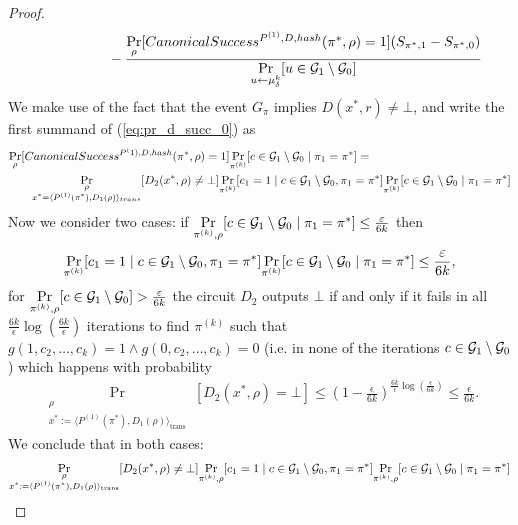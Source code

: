 \begin{proof}
\begin{align}
&\mbox\qquad\qquad\qquad-\frac{\underset{\rho}{\Pr}[CanonicalSuccess^{P^{(1)}, D, hash}(\pi^*, \rho) = 1] (S_{\pi^*,1} - S_{\pi^*,0})}
{\underset{u \leftarrow \mu_{\delta}^k}{\Pr}[u \in \mathcal{G}_1 \setminus \mathcal{G}_0]}
\end{align}
We make use of the fact that the event $G_{\pi}$ implies $D(x^*, r) \neq \bot$, and write the first summand of (\ref{eq:pr_d_succ_0}) as
\begin{align}
  &\underset{\rho}{\Pr}[CanonicalSuccess^{P^(1), D, hash}(\pi^*,\rho) = 1] \underset{\pi^{(k)}}{\Pr}[c \in \mathcal{G}_1 \setminus \mathcal{G}_0 \mid \pi_1 = \pi^*] = \notag\\
  &\mbox\qquad \underset{\substack{\rho \\ x^* = \langle P^{(1)}(\pi^*), D_1(\rho) \rangle_{trans}}}{\Pr}[D_2(x^*,\rho) \neq \bot]
  \underset{\pi^{(k)}}{\Pr}[c_1 = 1 \mid c \in \mathcal{G}_1 \setminus \mathcal{G}_0, \pi_1 = \pi^*]
  \underset{\pi^{(k)}}{\Pr}[c \in \mathcal{G}_1 \setminus \mathcal{G}_0 \mid \pi_1 = \pi^*]
\end{align}
Now we consider two cases:
if $\underset{\pi^{(k)}, \rho}{\Pr}[ c \in \mathcal{G}_1 \setminus \mathcal{G}_0 \mid \pi_1 = \pi^*] \leq \frac{\varepsilon}{6k}$ then
\begin{align}
  \underset{\pi^{(k)}}{\Pr}[c_1 = 1 \mid c \in \mathcal{G}_1 \setminus \mathcal{G}_0, \pi_1 = \pi^*] \underset{\pi^{(k)}}{\Pr}[c \in \mathcal{G}_1 \setminus \mathcal{G}_0 \mid \pi_1 = \pi^*] \leq \frac{\varepsilon}{6k},
\end{align}
for $\underset{\pi^{(k)}, \rho}{\Pr}[c \in \mathcal{G}_1 \setminus \mathcal{G}_0] > \frac{\varepsilon}{6k}$ the circuit $D_2$ outputs $\bot$
if and only if it fails in all $\frac{6k}{\epsilon} \log(\frac{6k}{\epsilon})$ iterations to find $\pi^{(k)}$ such that $g(1, c_2, \dots, c_k) = 1 \land g(0, c_2, \dots, c_k) = 0$
(i.e. in none of the iterations $c \in \mathcal{G}_1 \setminus \mathcal{G}_0$) which happens with probability
\begin{align}
\underset{\substack{\rho \\ x^* := \langle P^{(1)}(\pi^*), D_1(\rho) \rangle_{\text{trans}}}}{\Pr}[D_2(x^*,\rho) = \bot]
\leq (1 - \frac{\epsilon}{6k})^{\frac{6k}{\epsilon}\log(\frac{\epsilon}{6k})} \leq \frac{\epsilon}{6k}.
\end{align}
We conclude that in both cases:
\begin{align}
  &\underset{\substack{\rho \\ x^* := \langle P^{(1)}(\pi^*), D_1(\rho) \rangle_{\text{trans}}}}{\Pr}[D_2(x^*,\rho) \neq \bot]
  \underset{\pi^{(k)}, \rho}{\Pr}[c_1 = 1 \mid c \in \cG_1 \setminus \cG_0, \pi_1 = \pi^*]
  \underset{\pi^{(k)}, \rho}{\Pr}[c \in \cG_1 \setminus \cG_0 \mid \pi_1 = \pi^*] \notag\\

\end{align}
\end{proof}
